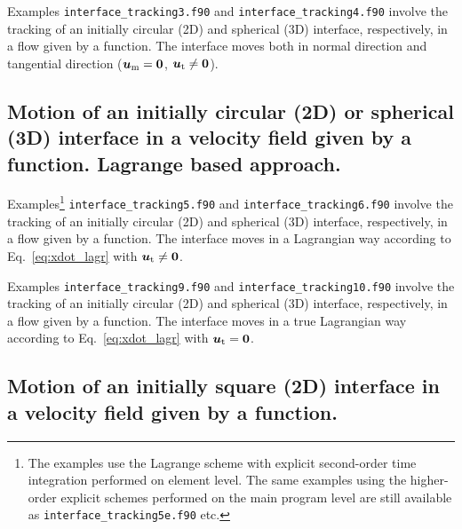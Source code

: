 Examples \texttt{interface\_tracking3.f90} and \texttt{interface\_tracking4.f90}
involve the tracking of an initially circular (2D) and spherical (3D)
interface, respectively, 
in a flow given by a function. The interface moves both
in normal direction and tangential direction
($\boldsymbol{u}_\text{m}=\boldsymbol{0}$, $\boldsymbol{u}_\text{t}\neq\boldsymbol{0}$).

\subsection{Motion of an initially circular (2D) or spherical (3D) interface 
in a velocity field given by a function. Lagrange based approach.}
\label{sec:interface_function_lagr}

Examples\footnote{The examples use the Lagrange scheme with explicit
second-order time integration performed on element level.
The same examples using the higher-order explicit schemes
performed on the main program level are still available as
 \texttt{interface\_tracking5e.f90} etc.}
 \texttt{interface\_tracking5.f90} and \texttt{interface\_tracking6.f90}
involve the tracking of an initially circular (2D) and spherical (3D)
interface, respectively, 
in a flow given by a function. The interface moves in a Lagrangian way
according to Eq.~\eqref{eq:xdot_lagr} with $\boldsymbol{u}_\text{t}\neq\boldsymbol{0}$.

Examples \texttt{interface\_tracking9.f90} and \texttt{interface\_tracking10.f90}
involve the tracking of an initially circular (2D) and spherical (3D)
interface, respectively, 
in a flow given by a function. The interface moves in a true Lagrangian way
according to Eq.~\eqref{eq:xdot_lagr} with $\boldsymbol{u}_\text{t}=\boldsymbol{0}$.

\subsection{Motion of an initially square (2D) interface 
in a velocity field given by a function.}
\label{sec:interface_function_lagr2}

